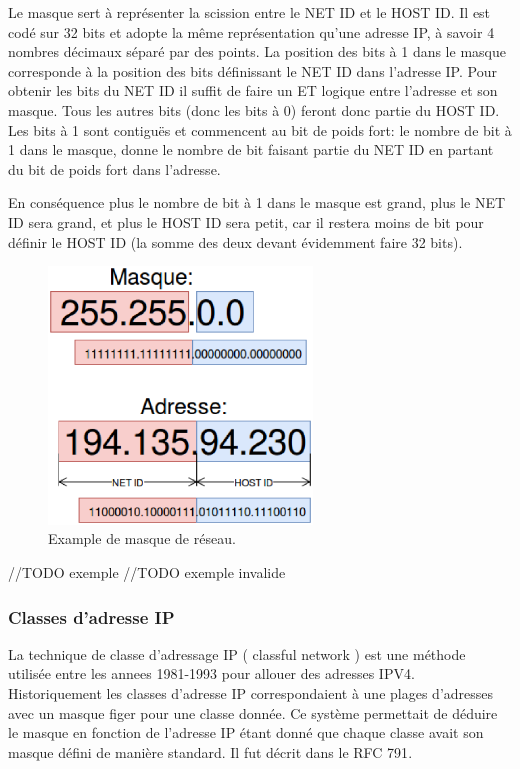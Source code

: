 Le masque sert à représenter la scission entre le NET ID et le HOST ID.
Il est codé sur 32 bits et adopte la même représentation qu'une adresse IP, à savoir
4 nombres décimaux séparé par des points.
La position des bits à 1 dans le masque corresponde à la position des bits définissant le NET ID dans l'adresse IP.
Pour obtenir les bits du NET ID il suffit de faire un ET logique entre l'adresse et son masque. Tous les autres bits (donc les bits à 0)
feront donc partie du HOST ID.
Les bits à 1 sont contiguës et commencent au bit de poids fort: le nombre de bit à 1 dans le masque, donne
le nombre de bit faisant partie du NET ID en partant du bit de poids fort dans l'adresse.

En conséquence plus le nombre de bit à 1 dans le masque est grand, plus le NET ID sera grand, et plus le HOST ID sera petit, car il restera moins de bit pour définir le HOST ID (la somme des deux devant évidemment faire 32 bits).

\begin{figure}
\centering
\includegraphics[width=7cm]{./pics/maskipv4.eps}
\caption{Example de masque de réseau.}
\label{fig:exmask}
\end{figure}

//TODO exemple
//TODO exemple invalide

\subsubsection{Classes d'adresse IP}
La technique de classe d'adressage IP ( classful network ) est une méthode
utilisée entre les annees 1981-1993 pour allouer des adresses IPV4.
Historiquement les classes d'adresse IP correspondaient à une plages d'adresses avec un masque figer pour une classe donnée.
Ce système permettait de déduire le masque en fonction
de l'adresse IP étant donné que chaque classe avait son masque défini de manière standard.
Il fut décrit dans le RFC 791\cite{url-RFC-791}.

